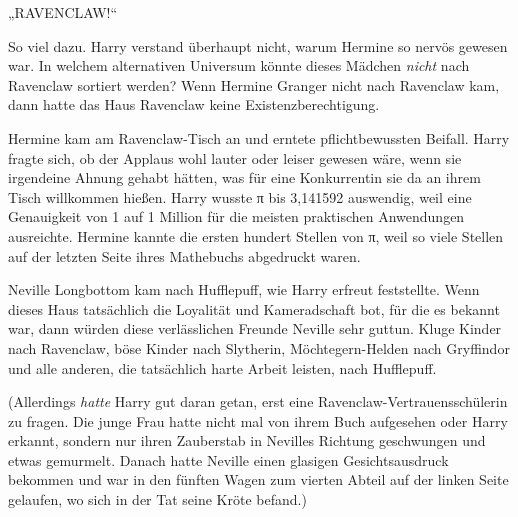 „RAVENCLAW!“

So viel dazu. Harry verstand überhaupt nicht, warum Hermine so nervös gewesen war. In welchem alternativen Universum könnte dieses Mädchen \emph{nicht} nach Ravenclaw sortiert werden? Wenn Hermine Granger nicht nach Ravenclaw kam, dann hatte das Haus Ravenclaw keine Existenzberechtigung.

Hermine kam am Ravenclaw-Tisch an und erntete pflichtbewussten Beifall. Harry fragte sich, ob der Applaus wohl lauter oder leiser gewesen wäre, wenn sie irgendeine Ahnung gehabt hätten, was für eine Konkurrentin sie da an ihrem Tisch willkommen hießen. Harry wusste π bis 3,141592 auswendig, weil eine Genauigkeit von 1 auf 1 Million für die meisten praktischen Anwendungen ausreichte. Hermine kannte die ersten hundert Stellen von π, weil so viele Stellen auf der letzten Seite ihres Mathebuchs abgedruckt waren.

Neville Longbottom kam nach Hufflepuff, wie Harry erfreut feststellte. Wenn dieses Haus tatsächlich die Loyalität und Kameradschaft bot, für die es bekannt war, dann würden diese verlässlichen Freunde Neville sehr guttun. Kluge Kinder nach Ravenclaw, böse Kinder nach Slytherin, Möchtegern-Helden nach Gryffindor und alle anderen, die tatsächlich harte Arbeit leisten, nach Hufflepuff.

(Allerdings \emph{hatte} Harry gut daran getan, erst eine Ravenclaw-Vertrauensschülerin zu fragen. Die junge Frau hatte nicht mal von ihrem Buch aufgesehen oder Harry erkannt, sondern nur ihren Zauberstab in Nevilles Richtung geschwungen und etwas gemurmelt. Danach hatte Neville einen glasigen Gesichtsausdruck bekommen und war in den fünften Wagen zum vierten Abteil auf der linken Seite gelaufen, wo sich in der Tat seine Kröte befand.)

